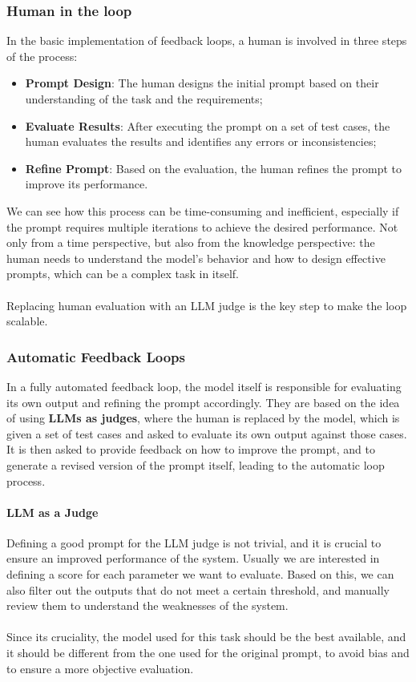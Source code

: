 \subsubsection{Human in the loop}
In the basic implementation of feedback loops, a human is involved in three steps of the process:
\begin{itemize}
    \item \textbf{Prompt Design}: The human designs the initial prompt based on their understanding of the task and the requirements;
    \item \textbf{Evaluate Results}: After executing the prompt on a set of test cases, the human evaluates the results and identifies 
    any errors or inconsistencies;
    \item \textbf{Refine Prompt}: Based on the evaluation, the human refines the prompt to improve its performance.
\end{itemize}
We can see how this process can be time-consuming and inefficient, especially if the prompt requires multiple iterations to achieve the desired performance.
Not only from a time perspective, but also from the knowledge perspective: the human needs to understand the model's behavior and how to design effective prompts,
which can be a complex task in itself.
\\\\
Replacing human evaluation with an LLM judge is the key step to make the loop scalable.

\subsubsection{Automatic Feedback Loops}
In a fully automated feedback loop, the model itself is responsible for evaluating its own output and refining the prompt accordingly.
They are based on the idea of using \textbf{LLMs as judges}, where the human is replaced by the model, 
which is given a set of test cases and asked to evaluate its own output against those cases.
It is then asked to provide feedback on how to improve the prompt, and to generate a revised version of the prompt itself, leading to the automatic loop process.

\paragraph{LLM as a Judge}
Defining a good prompt for the LLM judge is not trivial, and it is crucial to ensure an improved performance of the system.
Usually we are interested in defining a score for each parameter we want to evaluate.
Based on this, we can also filter out the outputs that do not meet a certain threshold, and manually review them to understand the weaknesses of the system.
\\\\
Since its cruciality, the model used for this task should be the best available, and it should be different 
from the one used for the original prompt, to avoid bias and to ensure a more objective evaluation.

